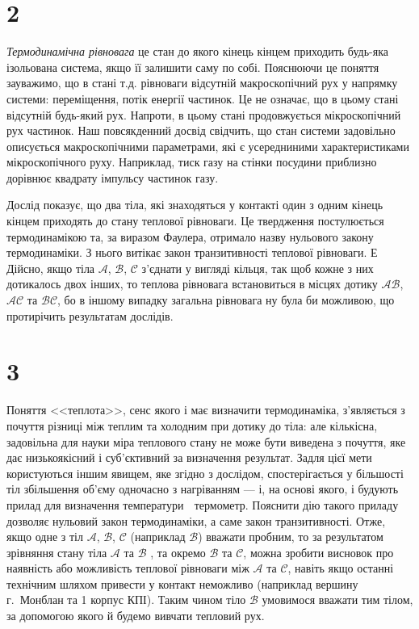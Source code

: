 \section{2}

\emph{Термодинамічна рівновага} це стан до якого кінець кінцем приходить будь-яка ізольована система, якщо її залишити саму по собі. Пояснюючи це поняття зауважимо, що в стані т.д. рівноваги відсутній макроскопічний рух у напрямку системи: переміщення, потік енергії частинок. Це не означає, що в цьому стані відсутній будь-який рух. Напроти, в цьому стані продовжується мікроскопічний рух частинок. Наш повсякденний досвід свідчить, що стан системи задовільно описується  макроскопічними параметрами, які є усередниними характеристиками мікроскопічного руху. Наприклад, тиск газу на стінки посудини приблизно дорівнює квадрату імпульсу частинок газу.


Дослід показує, що два тіла, які знаходяться у контакті один з одним кінець кінцем приходять до стану теплової рівноваги. Це твердження постулюється термодинамікою та, за виразом Фаулера, отримало назву нульового закону термодинаміки. З нього витікає закон транзитивності теплової рівноваги. Е Дійсно, якщо тіла $\mathcal{A}$, $\mathcal{B}$, $\mathcal{C}$ з'єднати у вигляді кільця, так щоб кожне з них дотикалось двох інших, то теплова рівновага встановиться в місцях дотику $\mathcal{AB}$, $\mathcal{AC}$ та $\mathcal{BC}$, бо в іншому випадку загальна рівновага ну була би можливою, що протирічить результатам дослідів.





\section{3}


Поняття <<теплота>>, сенс якого і має визначити термодинаміка, з'являється з почуття різниці між теплим та холодним при дотику до тіла: але кількісна, задовільна для науки міра теплового стану не може бути виведена з почуття, яке дає низькоякісний і суб'єктивний за визначення результат. Задля цієї мети користуються іншим явищем, яке згідно з дослідом, спостерігається у більшості тіл збільшення об'єму одночасно з нагріванням  --- і, на основі якого, і будують прилад для визначення температури  термометр. Пояснити дію такого приладу дозволяє нульовий закон термодинаміки, а саме закон транзитивності. Отже, якщо одне з тіл $\mathcal{A}$, $\mathcal{B}$, $\mathcal{C}$ (наприклад $\mathcal{B}$) вважати пробним, то за результатом зрівняння стану тіла $\mathcal{A}$ та $\mathcal{B}$ , та окремо $\mathcal{B}$ та $\mathcal{C}$, можна зробити висновок про наявність або можливість теплової рівноваги між $\mathcal{A}$ та $\mathcal{C}$, навіть якщо останні технічним шляхом привести у контакт неможливо (наприклад вершину г.~Монблан та 1 корпус КПІ). Таким чином тіло $\mathcal{B}$ умовимося вважати тим тілом, за допомогою якого й будемо вивчати тепловий рух.

